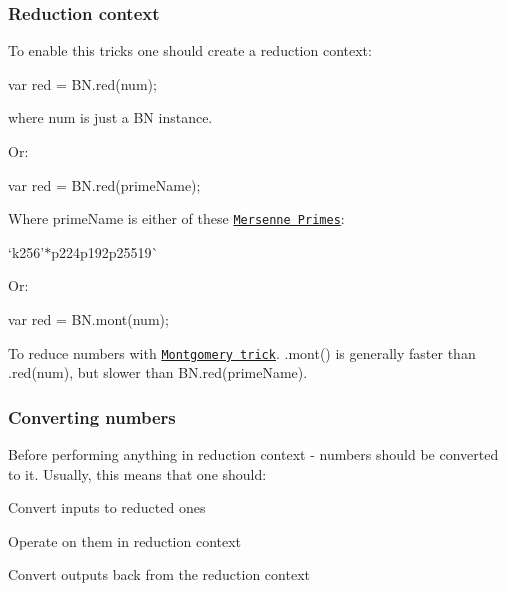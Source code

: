\subsubsection*{Reduction context}

To enable this tricks one should create a reduction context\+:


\begin{DoxyCode}
var red = BN.red(num);
\end{DoxyCode}
 where {\ttfamily num} is just a BN instance.

Or\+:


\begin{DoxyCode}
var red = BN.red(primeName);
\end{DoxyCode}


Where {\ttfamily prime\+Name} is either of these \href{https://en.wikipedia.org/wiki/Mersenne_prime}{\tt Mersenne Primes}\+:


\begin{DoxyItemize}
\item `\textquotesingle{}k256'{\ttfamily  $\ast$}\textquotesingle{}p224\textquotesingle{}{\ttfamily  $\ast$}\textquotesingle{}p192\textquotesingle{}{\ttfamily  $\ast$}\textquotesingle{}p25519\textquotesingle{}\`{}
\end{DoxyItemize}

Or\+:


\begin{DoxyCode}
var red = BN.mont(num);
\end{DoxyCode}


To reduce numbers with \href{https://en.wikipedia.org/wiki/Montgomery_modular_multiplication}{\tt Montgomery trick}. {\ttfamily .mont()} is generally faster than {\ttfamily .red(num)}, but slower than {\ttfamily B\+N.\+red(prime\+Name)}.

\subsubsection*{Converting numbers}

Before performing anything in reduction context -\/ numbers should be converted to it. Usually, this means that one should\+:


\begin{DoxyItemize}
\item Convert inputs to reducted ones
\item Operate on them in reduction context
\item Convert outputs back from the reduction context
\end{DoxyItemize}


